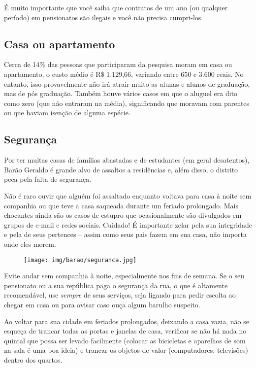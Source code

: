 É muito importante que você saiba que contratos de um ano (ou qualquer período)
em pensionatos são ilegais e você não precisa cumpri-los.

\subsection{Casa ou apartamento}

Cerca de 14\% das pessoas que participaram da pesquisa moram em casa ou
apartamento, o custo médio é R\$ 1.129,66, variando entre 650 e 3.600 reais.
No entanto, isso provavelmente não irá atrair muito as alunas e alunos de
graduação, mas de pós graduação. Também houve vários casos em que o aluguel era
dito como zero (que não entraram na média), significando que moravam com
parentes ou que haviam isenção de alguma espécie.

\subsection{Segurança}

Por ter muitas casas de famílias abastadas e de estudantes (em geral
desatentos), Barão Geraldo é grande alvo de assaltos a residências e, além
disso, o distrito peca pela falta de segurança.

Não é raro ouvir que alguém foi assaltado enquanto voltava para casa à noite
sem companhia ou que teve a casa saqueada durante um feriado prolongado. Mais
chocantes ainda são os casos de estupro que ocasionalmente são divulgados em
grupos de e-mail e redes sociais. Cuidado! É importante zelar pela sua
integridade e pela de seus pertences -- assim como seus pais fazem em sua casa,
não importa onde eles morem.

\begin{figure}[h!]
  \centering
  \texttt{[image: img/barao/seguranca.jpg]}
\end{figure}

Evite andar sem companhia à noite, especialmente nos fins de semana. Se o seu
pensionato ou a sua república paga o segurança da rua, o que é altamente
recomendável, use \emph{sempre} de seus serviços, seja ligando para pedir
escolta ao chegar em casa ou para avisar caso ouça algum barulho suspeito.

Ao voltar para sua cidade em feriados prolongados, deixando a casa vazia, não
se esqueça de trancar todas as portas e janelas de casa, verificar se não há
nada no quintal que possa ser levado facilmente (colocar as bicicletas e
aparelhos de som na sala é uma boa ideia) e trancar os objetos de valor
(computadores, televisões) dentro dos quartos.

